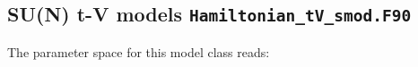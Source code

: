 

\subsection{SU(N)  t-V models  \texttt{Hamiltonian\_tV\_smod.F90}}


The parameter space for this model class  reads: 

